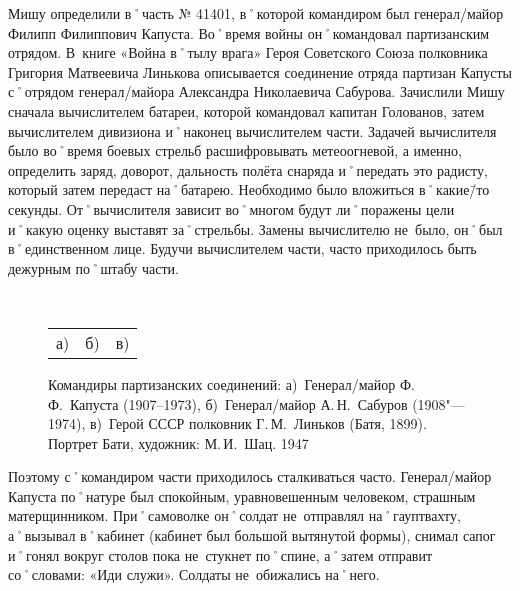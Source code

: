 Мишу определили в˚часть № 41401, в˚которой командиром был генерал\-/майор Филипп Филиппович Капуста. Во˚время войны он˚командовал партизанским отрядом. В~книге «Война в˚тылу врага» Героя Советского Союза полковника Григория Матвеевича Линькова описывается соединение отряда партизан Капусты с˚отрядом генерал\-/майора Александра Николаевича Сабурова. Зачислили Мишу сначала вычислителем батареи, которой командовал капитан Голованов, затем вычислителем дивизиона и˚наконец вычислителем части. Задачей вычислителя было во˚время боевых стрельб расшифровывать метеоогневой, а именно, определить заряд, доворот, дальность полёта снаряда и˚передать это радисту, который затем передаст на˚батарею. Необходимо было вложиться в˚какие\=/то секунды. От˚вычислителя зависит во˚многом будут ли˚поражены цели и˚какую оценку выставят за˚стрельбы. Замены вычислителю не~было, он˚был в˚единственном лице. Будучи вычислителем части, часто приходилось быть дежурным по˚штабу части. 

\begin{figure}[h]
	\hfil	
	\begin{minipage}[b]{0.32\linewidth}			
	\end{minipage}	
	\hfil	
	\begin{minipage}[b]{0.32\linewidth}	
	\end{minipage}	
	\hfil	
	\begin{minipage}[b]{0.32\linewidth}		
	\end{minipage}	
	\hfil
	\\[1ex]	
	\begin{minipage}[b]{.96\linewidth}
		\begin{tabular}{p{.32\linewidth}p{.32\linewidth}p{.32\linewidth}}
			\centering а) & \centering б) & \centering в) 
		\end{tabular}
	\end{minipage}	
	\captionsetup{skip=1ex}							%
	\caption{Командиры партизанских соединений: 
	а)~Генерал\-/майор Ф.\,Ф.~Капуста (1907--1973), 
	б)~Генерал\-/майор А.\,Н.~Сабуров (1908"---1974), 
	в)~Герой СССР полковник Г.\,М.~Линьков (Батя, 1899). Портрет Бати, художник: М.\,И.~Шац. 1947}
\end{figure}

Поэтому с˚командиром части приходилось сталкиваться часто. Генерал\-/майор Капуста по˚натуре был спокойным, уравновешенным человеком, страшным матерщинником. При˚самоволке он˚солдат не~отправлял на˚гауптвахту, а˚вызывал в˚кабинет (кабинет был большой вытянутой формы), снимал сапог и˚гонял вокруг столов пока не~стукнет по˚спине, а˚затем отправит со˚словами: «Иди служи». Солдаты не~обижались на˚него.

